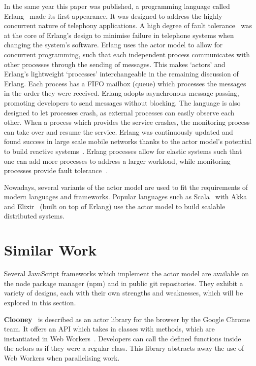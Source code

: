 \documentclass[oneside]{um-fict}
\begin{document}
In the same year this paper was published, a programming language called Erlang~\cite{erlang} made its first appearance. It was designed to address the highly concurrent nature of telephony applications. A high degree of fault tolerance~\cite{faulttolerance} was at the core of Erlang's design to minimise failure in telephone systems when changing the system's software. Erlang uses the actor model to allow for concurrent programming, such that each independent process communicates with other processes through the sending of messages. This makes `actors' and Erlang's lightweight `processes' interchangeable in the remaining discussion of Erlang. Each process has a FIFO mailbox (queue) which processes the messages in the order they were received. Erlang adopts asynchronous message passing, promoting developers to send messages without blocking. The language is also designed to let processes crash, as external processes can easily observe each other. When a process which provides the service crashes, the monitoring process can take over and resume the service. Erlang was continuously updated and found success in large scale mobile networks thanks to the actor model's potential to build reactive systems~\cite{reactivemanifesto}. Erlang processes allow for elastic systems such that one can add more processes to address a larger workload, while monitoring processes provide fault tolerance~\cite{faulttolerance}.

Nowadays, several variants of the actor model are used to fit the requirements of modern languages and frameworks. Popular languages such as Scala~\cite{scala} with Akka~\cite{akka} and Elixir~\cite{elixir} (built on top of Erlang) use the actor model to build scalable distributed systems.

\section{Similar Work}
Several JavaScript frameworks which implement the actor model are available on the node package manager (npm) and in public git repositories. They exhibit a variety of designs, each with their own strengths and weaknesses, which will be explored in this section.

\textbf{Clooney}~\cite{clooney} is described as an actor library for the browser by the Google Chrome team. It offers an API which takes in classes with methods, which are instantiated in Web Workers~\cite{webworkers}. Developers can call the defined functions inside the actors as if they were a regular class. This library abstracts away the use of Web Workers when parallelising work.
\end{document}
